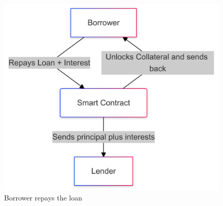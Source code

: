 \documentclass[11pt,a4paper,titlepage]{scrartcl}
\begin{document}
\begin{figure}[ht]
    \centering
    \begin{minipage}[t]{0.53\textwidth} %
        \centering
        \includegraphics[width=\textwidth]{image/otcrepayment}
        \caption{Borrower repays the loan}
        \label{fig:repays}
    \end{minipage}
    \hfill %
    \begin{minipage}[t]{0.3\textwidth} %
        \centering

\end{minipage}
\end{figure}
\end{document}
